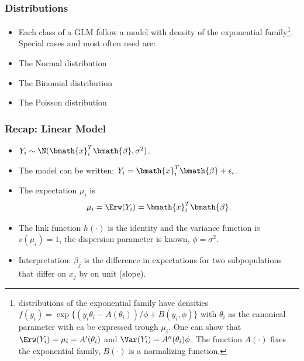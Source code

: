 \documentclass[extsize,handout,10pt]{beamer}\usepackage[]{graphicx}\usepackage[]{color}
\begin{document}
\begin{frame}
  \frametitle{Distributions}
  \begin{itemize}
  \item Each class of a GLM follow a model with density of the
    \alert{exponential family}\footnote{\tiny distributions of the
      exponential family have densities 
      $f(y_i)=\exp\{(y_i\theta_{i}-A(\theta_i))/\phi+B(y_i,\phi)\}$
      with $\theta_{i}$ as the \alert{canonical parameter} with ca be
      expressed trough $\mu_i$. One can show that
      $\Erw(Y_i)=\mu_i=A'(\theta_{i})$ and
      $\Var(Y_i)=A''(\theta_i)\phi$. The function $A(\cdot)$ fixes the
      exponential family, $B(\cdot)$ is a normalizing function.}. Special cases and most often used are:
    \item The \alert{Normal distribution}
    \item The \alert{Binomial distribution}
    \item The \alert{Poisson distribution}
  \end{itemize}

\end{frame}


\begin{frame}
  \frametitle{Recap: Linear Model}
  \begin{itemize}
  \item $Y_i\sim \N(\bmath{x}^T_i\bmath{\beta},\sigma^2)$.
  \item The model can be written:
    $Y_i=\bmath{x}^T_i\bmath{\beta}+\epsilon_i$. 
  \item The expectation
    $\mu_i$ is
    \begin{equation}
      \label{eq:54}
      \mu_i=\Erw(Y_i)=\bmath{x}^T_i\bmath{\beta}.
    \end{equation}
  \item The link function $h(\cdot)$ is the identity and the
    variance function is $v(\mu_i)=1$, the dispersion parameter is
    known, $\phi=\sigma^2$.
  \item Interpretation: $\beta_j$ is the difference in expectations
    for two subpopulations that differ on $x_j$ by on unit (slope).
  \end{itemize}
\end{frame}
\end{document}
